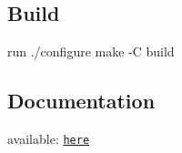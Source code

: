 \subsection*{Build}

run ./configure make -\/C build

\subsection*{Documentation}

available\+: \href{doc/html/}{\tt here} 